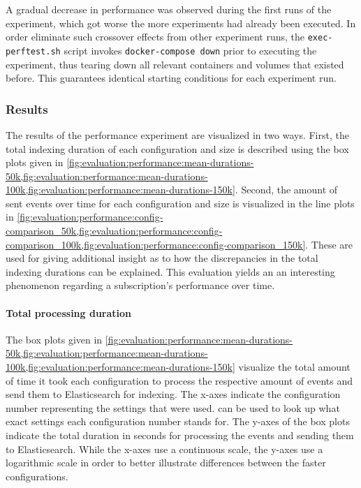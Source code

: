 A gradual decrease in performance was observed during the first runs of the experiment, which got worse the more experiments had already been executed.
In order eliminate such crossover effects from other experiment runs, the \texttt{exec-perftest.sh} script invokes \texttt{docker-compose down} prior to executing the experiment, thus tearing down all relevant containers and volumes that existed before.
This guarantees identical starting conditions for each experiment run.

\subsubsection{Results}

The results of the performance experiment are visualized in two ways.
First, the total indexing duration of each configuration and size is described using the box plots given in \cref{fig:evaluation:performance:mean-durations-50k,fig:evaluation:performance:mean-durations-100k,fig:evaluation:performance:mean-durations-150k}.
Second, the amount of sent events over time for each configuration and size is visualized in the line plots in \cref{fig:evaluation:performance:config-comparison_50k,fig:evaluation:performance:config-comparison_100k,fig:evaluation:performance:config-comparison_150k}.
These are used for giving additional insight as to how the discrepancies in the total indexing durations can be explained.
This evaluation yields an an interesting phenomenon regarding a subscription's performance over time.

\paragraph{Total processing duration}

The box plots given in \cref{fig:evaluation:performance:mean-durations-50k,fig:evaluation:performance:mean-durations-100k,fig:evaluation:performance:mean-durations-150k} visualize the total amount of time it took each configuration to process the respective amount of events and send them to Elasticsearch for indexing.
The x-axes indicate the configuration number representing the settings that were used.
 can be used to look up what exact settings each configuration number stands for.
The y-axes of the box plots indicate the total duration in seconds for processing the events and sending them to Elasticsearch.
While the x-axes use a continuous scale, the y-axes use a logarithmic scale in order to better illustrate differences between the faster configurations.

